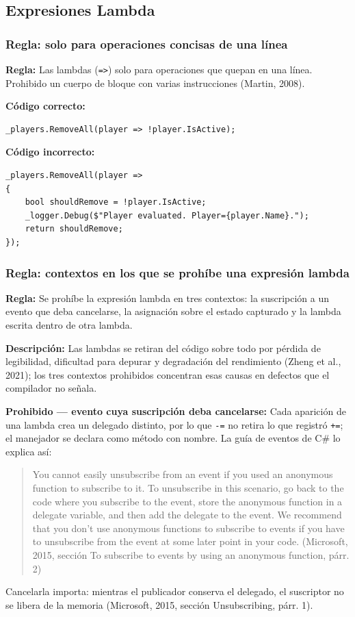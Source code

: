 \subsection{Expresiones Lambda}

\subsubsection{Regla: solo para operaciones concisas de una línea}

\textbf{Regla:} Las lambdas (\texttt{=>}) solo para operaciones que quepan en una línea. Prohibido un cuerpo de bloque con varias instrucciones (Martin, 2008).

\textbf{Código correcto:}
\begin{lstlisting}[style=csharpstyle]
_players.RemoveAll(player => !player.IsActive);
\end{lstlisting}

\textbf{Código incorrecto:}
\begin{lstlisting}[style=csharpstyle]
_players.RemoveAll(player =>
{
    bool shouldRemove = !player.IsActive;
    _logger.Debug($"Player evaluated. Player={player.Name}.");
    return shouldRemove;
});
\end{lstlisting}

\subsubsection{Regla: contextos en los que se prohíbe una expresión lambda}

\textbf{Regla:} Se prohíbe la expresión lambda en tres contextos: la suscripción a un evento que deba cancelarse, la asignación sobre el estado capturado y la lambda escrita dentro de otra lambda.

\textbf{Descripción:} Las lambdas se retiran del código sobre todo por pérdida de legibilidad, dificultad para depurar y degradación del rendimiento (Zheng et al., 2021); los tres contextos prohibidos concentran esas causas en defectos que el compilador no señala.

\textbf{Prohibido --- evento cuya suscripción deba cancelarse:} Cada aparición de una lambda crea un delegado distinto, por lo que \texttt{-=} no retira lo que registró \texttt{+=}; el manejador se declara como método con nombre. La guía de eventos de C\# lo explica así:
\begin{quote}
You cannot easily unsubscribe from an event if you used an anonymous function to subscribe to it. To unsubscribe in this scenario, go back to the code where you subscribe to the event, store the anonymous function in a delegate variable, and then add the delegate to the event. We recommend that you don't use anonymous functions to subscribe to events if you have to unsubscribe from the event at some later point in your code. (Microsoft, 2015, sección To subscribe to events by using an anonymous function, párr. 2)
\end{quote}
\noindent Cancelarla importa: mientras el publicador conserva el delegado, el suscriptor no se libera de la memoria (Microsoft, 2015, sección Unsubscribing, párr. 1).

